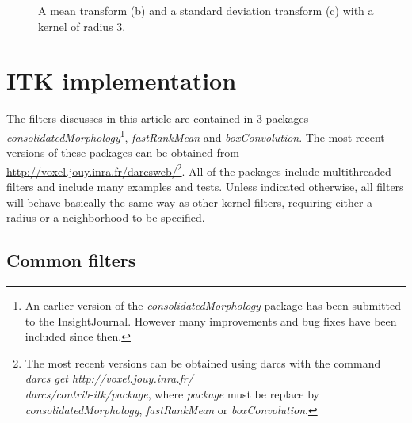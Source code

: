 \documentclass[a4paper]{InsightArticle}
\begin{document}
\begin{figure}[htbp]
\begin{center}
\caption{A mean transform (b) and a standard deviation transform (c) with a kernel of radius 3.}
\end{center}
\end{figure}


\section{ITK implementation}
The filters discusses in this article are contained in 3 packages --
{\em consolidatedMorphology}\footnote{An earlier version of the {\em consolidatedMorphology} package has
been submitted to the InsightJournal. However many improvements and
bug fixes have been included since then.}, {\em fastRankMean} and {\em
boxConvolution}. The most recent versions of these packages can be
obtained from \url{http://voxel.jouy.inra.fr/darcsweb/}\footnote{
The most recent versions can be obtained using darcs \cite{DarcsWebSite}
with the command {\em darcs get http://voxel.jouy.inra.fr/\\darcs/contrib-itk/package},
where {\em package} must be replace by {\em consolidatedMorphology},
{\em fastRankMean} or {\em boxConvolution}.}.
All of the packages
include multithreaded filters and include many examples and tests. Unless
indicated otherwise, all filters will behave basically the same way as
other kernel filters, requiring either a radius or a neighborhood to
be specified.

\subsection{Common filters}
\end{document}
